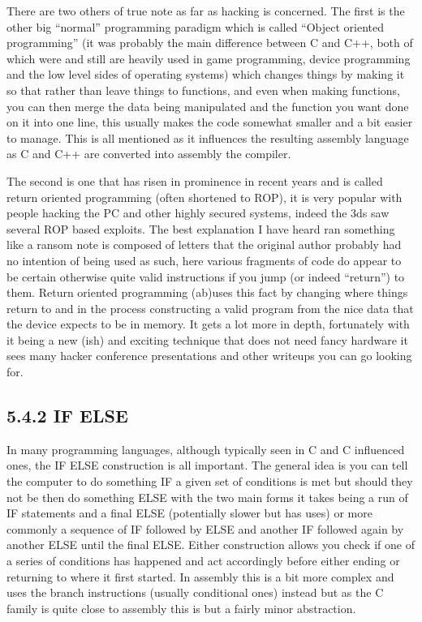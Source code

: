 \documentclass[
]{book}
\begin{document}
There are two others of true note as far as hacking is concerned. The first is the other big ``normal'' programming paradigm which is called ``Object oriented programming'' (it was probably the main difference between C and C++, both of which were and still are heavily used in game programming, device programming and the low level sides of operating systems) which changes things by making it so that rather than leave things to functions, and even when making functions, you can then merge the data being manipulated and the function you want done on it into one line, this usually makes the code somewhat smaller and a bit easier to manage. This is all mentioned as it influences the resulting assembly language as C and C++ are converted into assembly the compiler.

The second is one that has risen in prominence in recent years and is called return oriented programming (often shortened to ROP), it is very popular with people hacking the PC and other highly secured systems, indeed the 3ds saw several ROP based exploits. The best explanation I have heard ran something like a ransom note is composed of letters that the original author probably had no intention of being used as such, here various fragments of code do appear to be certain otherwise quite valid instructions if you jump (or indeed ``return'') to them. Return oriented programming (ab)uses this fact by changing where things return to and in the process constructing a valid program from the nice data that the device expects to be in memory. It gets a lot more in depth, fortunately with it being a new (ish) and exciting technique that does not need fancy hardware it sees many hacker conference presentations and other writeups you can go looking for.

\hypertarget{if-else}{%
\subsection{5.4.2 IF ELSE}\label{if-else}}

In many programming languages, although typically seen in C and C influenced ones, the IF ELSE construction is all important. The general idea is you can tell the computer to do something IF a given set of conditions is met but should they not be then do something ELSE with the two main forms it takes being a run of IF statements and a final ELSE (potentially slower but has uses) or more commonly a sequence of IF followed by ELSE and another IF followed again by another ELSE until the final ELSE. Either construction allows you check if one of a series of conditions has happened and act accordingly before either ending or returning to where it first started. In assembly this is a bit more complex and uses the branch instructions (usually conditional ones) instead but as the C family is quite close to assembly this is but a fairly minor abstraction.
\end{document}
